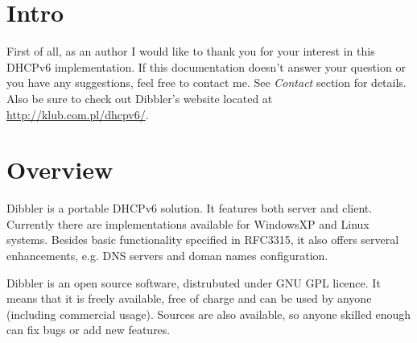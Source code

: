 
\section{Intro}
First of all, as an author I would like to thank you for your interest
in this DHCPv6 implementation. If this documentation doesn't answer
your question or you have any suggestions, feel free to contact
me. See \emph{Contact} section for details. Also be sure to check out
Dibbler's website located at \url{http://klub.com.pl/dhcpv6/}.


\section{Overview}

Dibbler is a portable DHCPv6 solution. It features both server and
client. Currently there are implementations available for WindowsXP
and Linux systems. Besides basic functionality specified in RFC3315,
it also offers serveral enhancements, e.g. DNS servers and doman names
configuration.

Dibbler is an open source software, distrubuted under GNU GPL
licence. It means that it is freely available, free of charge and can
be used by anyone (including commercial usage). Sources are also
available, so anyone skilled enough can fix bugs or add new features.

